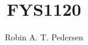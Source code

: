 \documentclass{article}
\begin{document}
  \title{FYS1120}
  \author{Robin A. T. Pedersen}
  \maketitle
\end{document}
